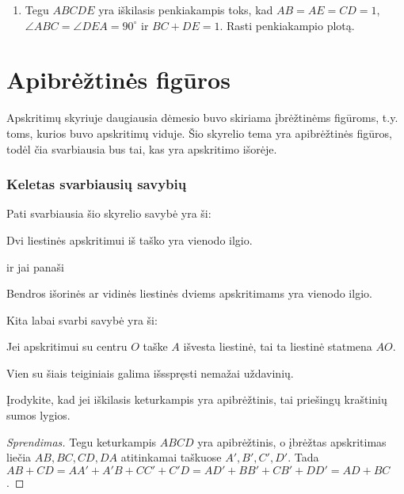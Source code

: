 \begin{enumerate}
\item Tegu $ABCDE$ yra iškilasis penkiakampis toks, kad
  $AB=AE=CD=1$, $\angle ABC=\angle DEA=90^\circ$ ir
  $BC+DE=1$. Rasti penkiakampio plotą.  

\end{enumerate}


\newpage
\section{Apibrėžtinės figūros}

Apskritimų skyriuje daugiausia dėmesio buvo skiriama
įbrėžtinėms figūroms, t.y. toms, kurios buvo apskritimų
viduje. Šio skyrelio tema yra apibrėžtinės figūros, todėl
čia svarbiausia bus tai, kas yra apskritimo išorėje. 

\subsubsection{Keletas svarbiausių savybių}

Pati svarbiausia šio skyrelio savybė yra ši:

\begin{teig}
  Dvi liestinės apskritimui iš taško yra vienodo ilgio.
\end{teig}

ir jai panaši
\begin{teig}
  Bendros išorinės ar vidinės liestinės dviems apskritimams yra vienodo ilgio.
\end{teig}

Kita labai svarbi savybė yra ši:

\begin{teig}
  Jei apskritimui su centru $O$ taške $A$ išvesta liestinė,
  tai ta liestinė statmena $AO$.
\end{teig}

Vien su šiais teiginiais galima išsspręsti nemažai
uždavinių.

\begin{pav}
  Įrodykite, kad jei iškilasis keturkampis yra apibrėžtinis,
  tai priešingų kraštinių sumos lygios. 
\end{pav}

\begin{proof}[Sprendimas]
  Tegu keturkampis $ABCD$ yra apibrėžtinis, o įbrėžtas
  apskritimas liečia $AB,BC,CD,DA$ atitinkamai taškuose
  $A',B',C',D'$. Tada $AB+CD = AA'+A'B+CC'+C'D =
  AD'+BB'+CB'+DD' = AD+BC$.
\end{proof}

